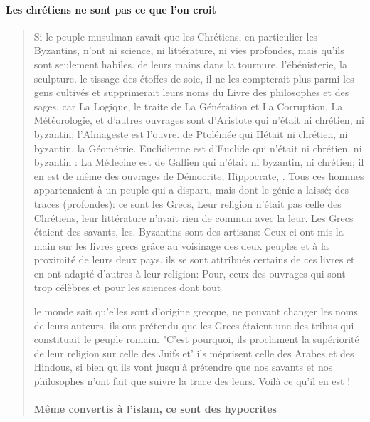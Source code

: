 \paragraph{Les chrétiens ne sont pas ce que l'on croit}
\begin{quote}
    

Si le peuple musulman savait que les Chrétiens, en particulier les Byzantins, n'ont ni science, ni littérature, ni vies profondes, mais qu'ils sont seulement habiles. de leurs mains dans la tournure, l'ébénisterie, la sculpture. le tissage des étoffes de soie, il ne les compterait plus parmi les gens cultivés et supprimerait leurs noms du Livre des philosophes et des sages, car La Logique, le traite de La Génération et La Corruption, La Météorologie, et d'autres ouvrages sont d'Aristote qui n'était ni chrétien, ni byzantin; l'Almageste est l'ouvre. de Ptolémée qui Hétait ni chrétien, ni byzantin, la Géométrie. Euclidienne est d'Euclide qui n'était ni chrétien, ni byzantin : La Médecine est de Gallien qui n'était ni byzantin, ni chrétien; il en est de même des ouvrages de Démocrite; Hippocrate, . Tous ces hommes appartenaient à un peuple qui a disparu, mais dont le génie a laissé; des traces (profondes): ce sont les Grecs, Leur religion n'était pas celle des Chrétiens, leur littérature n'avait rien de commun avec la leur. Les Grecs étaient des savants, les. Byzantins sont des artisans: Ceux-ci ont mis la main sur les livres grecs grâce au voisinage des deux peuples et à la proximité de leurs deux pays. ils se sont attribués certains de ces livres et. en ont adapté d'autres à leur religion: Pour, ceux des ouvrages qui sont trop célèbres et pour les sciences dont tout \item le monde sait qu'elles sont d'origine grecque, ne pouvant changer les noms de leurs auteurs, ils ont prétendu que les Grecs étaient une des tribus qui constituait le peuple romain.
"C'est pourquoi, ils proclament la supériorité de leur religion sur celle des Juifs et' ils méprisent celle des Arabes et des Hindous, si bien qu'ils vont jusqu'à prétendre que nos savants et nos philosophes n'ont fait que suivre la trace des leurs. Voilà ce qu'il en est !

\paragraph{Même convertis à l'islam, ce sont des hypocrites}


\end{quote}
